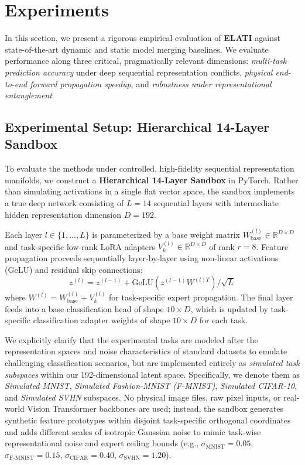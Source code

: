 \section{Experiments}
\label{sec:experiments}

In this section, we present a rigorous empirical evaluation of \textbf{ELATI} against state-of-the-art dynamic and static model merging baselines.
We evaluate performance along three critical, pragmatically relevant dimensions: \emph{multi-task prediction accuracy} under deep sequential representation conflicts, \emph{physical end-to-end forward propagation speedup}, and \emph{robustness under representational entanglement}.

\subsection{Experimental Setup: Hierarchical 14-Layer Sandbox}
To evaluate the methods under controlled, high-fidelity sequential representation manifolds, we construct a \textbf{Hierarchical 14-Layer Sandbox} in PyTorch.
Rather than simulating activations in a single flat vector space, the sandbox implements a true deep network consisting of $L = 14$ sequential layers with intermediate hidden representation dimension $D = 192$.

Each layer $l \in \{1, \dots, L\}$ is parameterized by a base weight matrix $W_{\text{base}}^{(l)} \in \mathbb{R}^{D \times D}$ and task-specific low-rank LoRA adapters $V_k^{(l)} \in \mathbb{R}^{D \times D}$ of rank $r = 8$.
Feature propagation proceeds sequentially layer-by-layer using non-linear activations (GeLU) and residual skip connections:
\begin{equation}
    z^{(l)} = z^{(l-1)} + \text{GeLU}\left(z^{(l-1)} W^{(l)T}\right) / \sqrt{L}
\end{equation}
where $W^{(l)} = W_{\text{base}}^{(l)} + V_k^{(l)}$ for task-specific expert propagation.
The final layer feeds into a base classification head of shape $10 \times D$, which is updated by task-specific classification adapter weights of shape $10 \times D$ for each task.

We explicitly clarify that the experimental tasks are modeled after the representation spaces and noise characteristics of standard datasets to emulate challenging classification scenarios, but are implemented entirely as \emph{simulated task subspaces} within our 192-dimensional latent space. Specifically, we denote them as \emph{Simulated MNIST}, \emph{Simulated Fashion-MNIST (F-MNIST)}, \emph{Simulated CIFAR-10}, and \emph{Simulated SVHN} subspaces. No physical image files, raw pixel inputs, or real-world Vision Transformer backbones are used; instead, the sandbox generates synthetic feature prototypes within disjoint task-specific orthogonal coordinates and adds different scales of isotropic Gaussian noise to mimic task-wise representational noise and expert ceiling bounds (e.g., $\sigma_{\text{MNIST}} = 0.05$, $\sigma_{\text{F-MNIST}} = 0.15$, $\sigma_{\text{CIFAR}} = 0.40$, $\sigma_{\text{SVHN}} = 1.20$).

